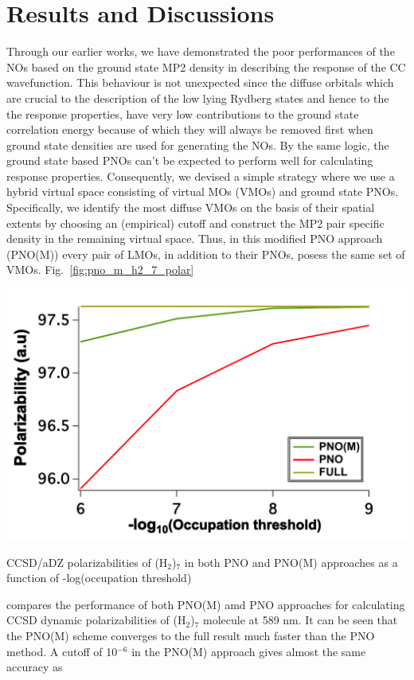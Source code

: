 \section{Results and Discussions}
Through our earlier works\cite{Kumar17,Kumar18:1}, we have demonstrated the poor performances of 
the NOs based on the ground state MP2 density in describing the response 
of the CC wavefunction. This behaviour is not unexpected since the diffuse orbitals
which are crucial to the description of the low lying Rydberg states and hence to the  
the response properties, have very low contributions to the ground state correlation energy
because of which they will always be removed first when ground state densities are used
for generating the NOs. By the same logic, the ground state based PNOs can't be expected to 
perform well for calculating response properties. Consequently, we devised a simple strategy 
where we use a hybrid virtual space consisting of virtual MOs (VMOs) and ground state PNOs. 
Specifically, we identify the most diffuse VMOs on the basis of their spatial extents\cite{Kumar18:1} 
by choosing an (empirical) cutoff and construct the MP2 pair specific density in the remaining  
virtual space. Thus, in this modified PNO approach (PNO(M)) every pair of LMOs, in addition to 
their PNOs, posess the same set of VMOs. 
Fig.~\ref{fig:pno_m_h2_7_polar}
\begin{MyFigure}[h!]
\centering
\includegraphics[width=0.6\linewidth,natwidth=610,natheight=642]{figures_pno++/pno_m_h2_7_adz_polar.pdf}
\caption{{\footnotesize CCSD/aDZ polarizabilities of (H$_2$)$_7$ in both PNO and PNO(M) approaches 
as a function of -log(occupation threshold)}}
\label{fig:pno_m_h2_7_polar}
\end{MyFigure}
compares the performance of both PNO(M) amd PNO approaches for calculating CCSD dynamic polarizabilities of
(H$_2$)$_7$ molecule at 589 nm. It can be seen that the PNO(M) scheme converges to the full result much 
faster than the PNO method. A cutoff of 10$^{-6}$ in the PNO(M) approach gives almost the same accuracy as 
